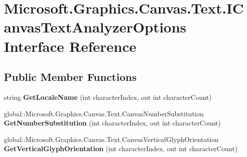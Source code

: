 \hypertarget{interface_microsoft_1_1_graphics_1_1_canvas_1_1_text_1_1_i_canvas_text_analyzer_options}{}\section{Microsoft.\+Graphics.\+Canvas.\+Text.\+I\+Canvas\+Text\+Analyzer\+Options Interface Reference}
\label{interface_microsoft_1_1_graphics_1_1_canvas_1_1_text_1_1_i_canvas_text_analyzer_options}
\subsection*{Public Member Functions}
\begin{DoxyCompactItemize}
\item 
\mbox{\label{interface_microsoft_1_1_graphics_1_1_canvas_1_1_text_1_1_i_canvas_text_analyzer_options_a918dda2a30e63c86197d6254b303dc11}} 
string {\bfseries Get\+Locale\+Name} (int character\+Index, out int character\+Count)
\item 
\mbox{\label{interface_microsoft_1_1_graphics_1_1_canvas_1_1_text_1_1_i_canvas_text_analyzer_options_a92599de3b68cec12b6272b3f8255df0f}} 
global\+::\+Microsoft.\+Graphics.\+Canvas.\+Text.\+Canvas\+Number\+Substitution {\bfseries Get\+Number\+Substitution} (int character\+Index, out int character\+Count)
\item 
\mbox{\label{interface_microsoft_1_1_graphics_1_1_canvas_1_1_text_1_1_i_canvas_text_analyzer_options_abaa5fe96fbf3026ac7b40c3751f31d02}} 
global\+::\+Microsoft.\+Graphics.\+Canvas.\+Text.\+Canvas\+Vertical\+Glyph\+Orientation {\bfseries Get\+Vertical\+Glyph\+Orientation} (int character\+Index, out int character\+Count)
\item 
\mbox{\label{interface_microsoft_1_1_graphics_1_1_canvas_1_1_text_1_1_i_canvas_text_analyzer_options_afd7cb7f1e71931b402fe4a142b98b27c}} 

\end{DoxyCompactItemize}
